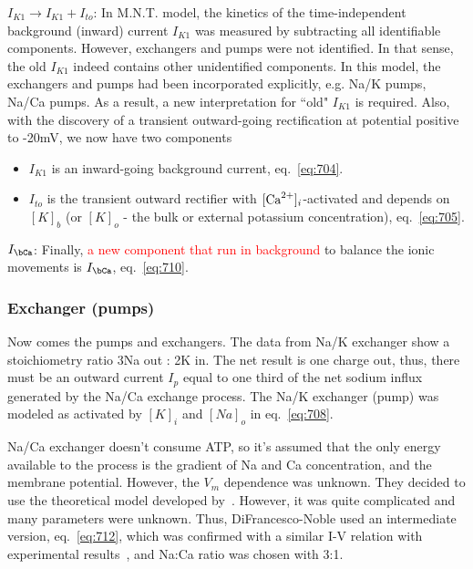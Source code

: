 {\bf $I_{K1} \rightarrow I_{K1} + I_{to}$}: In M.N.T. model, the kinetics of the
time-independent background (inward) current $I_{K1}$ was measured by
subtracting all identifiable components. However, exchangers and pumps were not
identified. In that sense, the old $I_{K1}$ indeed contains other unidentified
components. In this model, the exchangers and pumps had been incorporated
explicitly, e.g. Na/K pumps, Na/Ca pumps. As a result, a new interpretation for
``old" $I_{K1}$ is required. Also, with the discovery of a transient
outward-going rectification at potential positive to -20mV, we now have two components
\begin{itemize}
\item $I_{K1}$ is an inward-going background current,
  eq.~\eqref{eq:704}.

\item $I_{to}$ is the transient outward rectifier with
  $[{\text{Ca}^{2+}}]_i$-activated and depends on $[K]_b$ (or $[K]_o$ - the bulk or
  external potassium concentration), eq.~\eqref{eq:705}.
\end{itemize}

{\bf $I_\bCa$}: Finally, 
\textcolor{red}{a new component that run in background} to balance the
ionic movements is $I_\bCa$, eq.~\eqref{eq:710}.


\subsubsection{Exchanger (pumps)}
\label{sec:exchanger-pumps}

Now comes the pumps and exchangers. The data from Na/K exchanger show
a stoichiometry ratio 3Na out : 2K in. The net result is one charge
out, thus, there must be an outward current $I_p$ equal to one third
of the net sodium influx generated by the Na/Ca exchange process.  The
Na/K exchanger (pump) was modeled as activated by $[K]_i$ and $[Na]_o$
in eq.~\eqref{eq:708}.

Na/Ca exchanger doesn't consume ATP, so it's assumed that the only
energy available to the process is the gradient of Na and Ca
concentration, and the membrane potential. However, the $V_m$
dependence was unknown. They decided to use the theoretical model
developed by~\citep{mullins1981}. However, it was quite complicated and many
parameters were unknown. Thus, DiFrancesco-Noble used an intermediate
version, eq.~\eqref{eq:712}, which was confirmed with a similar I-V
relation with experimental results~\citep{kimura1986}, and Na:Ca ratio was
chosen with 3:1.

